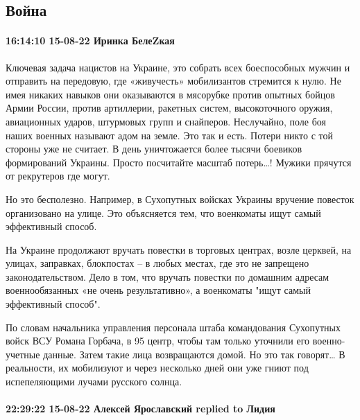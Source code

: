  
 
 
 
 

\subsection{Война}

\paragraph{16:14:10 15-08-22 Иринка БелеZкая}

Ключевая задача нацистов на Украине, это собрать всех боеспособных мужчин и
отправить на передовую, где «живучесть» мобилизантов стремится к нулю. Не имея
никаких навыков они оказываются в мясорубке против опытных бойцов Армии России,
против артиллерии, ракетных систем, высокоточного оружия, авиационных ударов,
штурмовых групп и снайперов. Неслучайно, поле боя наших военных называют адом
на земле. Это так и есть. Потери никто с той стороны уже не считает. В день
уничтожается более тысячи боевиков формирований Украины. Просто посчитайте
масштаб потерь…! Мужики прячутся от рекрутеров где могут.

Но это бесполезно. Например, в Сухопутных войсках Украины вручение повесток
организовано на улице. Это объясняется тем, что военкоматы ищут самый
эффективный способ.

На Украине продолжают вручать повестки в торговых центрах, возле церквей, на
улицах, заправках, блокпостах – в любых местах, где это не запрещено
законодательством. Дело в том, что вручать повестки по домашним адресам
военнообязанных «не очень результативно», а военкоматы "ищут самый эффективный
способ".

По словам начальника управления персонала штаба командования Сухопутных войск
ВСУ Романа Горбача, в 95%
центр, чтобы там только уточнили его военно-учетные данные. Затем такие лица
возвращаются домой. Но это так говорят… В реальности, их мобилизуют и через
несколько дней они уже гниют под испепеляющими лучами русского солнца.

\paragraph{22:29:22 15-08-22 Алексей Ярославский replied to Лидия}

